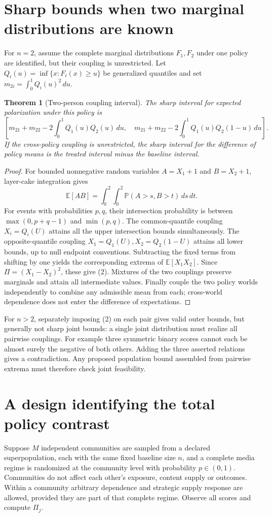 \documentclass[11pt,a4paper]{article}
\newtheorem{theorem}{Theorem}[section]
\newcommand{\E}{\mathbb E}
\newcommand{\Prob}{\mathbb P}
\begin{document}
\section{Sharp bounds when two marginal distributions are known}
For $n=2$, assume the complete marginal distributions $F_1,F_2$ under one policy are identified, but their coupling is unrestricted. Let $Q_i(u)=\inf\{x:F_i(x)\ge u\}$ be generalized quantiles and set $m_{2i}=\int_0^1Q_i(u)^2\,du$.

\begin{theorem}[Two-person coupling interval]
The sharp interval for expected polarization under this policy is
\[
 \left[
 m_{21}+m_{22}-2\int_0^1Q_1(u)Q_2(u)\,du,
 \quad
 m_{21}+m_{22}-2\int_0^1Q_1(u)Q_2(1-u)\,du
 \right].                                                \tag{2}
\]
If the cross-policy coupling is unrestricted, the sharp interval for the difference of policy means is the treated interval minus the baseline interval.
\end{theorem}
\begin{proof}
For bounded nonnegative random variables $A=X_1+1$ and $B=X_2+1$, layer-cake integration gives
\[
 \E[AB]=\int_0^2\int_0^2\Prob(A>s,B>t)\,ds\,dt.
\]
For events with probabilities $p,q$, their intersection probability is between $\max(0,p+q-1)$ and $\min(p,q)$. The common-quantile coupling $X_i=Q_i(U)$ attains all the upper intersection bounds simultaneously. The opposite-quantile coupling $X_1=Q_1(U),X_2=Q_2(1-U)$ attains all lower bounds, up to null endpoint conventions. Subtracting the fixed terms from shifting by one yields the corresponding extrema of $\E[X_1X_2]$. Since $\Pi=(X_1-X_2)^2$, these give (2). Mixtures of the two couplings preserve marginals and attain all intermediate values. Finally couple the two policy worlds independently to combine any admissible mean from each; cross-world dependence does not enter the difference of expectations.
\end{proof}

For $n>2$, separately imposing (2) on each pair gives valid outer bounds, but generally not sharp joint bounds: a single joint distribution must realize all pairwise couplings. For example three symmetric binary scores cannot each be almost surely the negative of both others. Adding the three asserted relations gives a contradiction. Any proposed population bound assembled from pairwise extrema must therefore check joint feasibility.

\section{A design identifying the total policy contrast}
Suppose $M$ independent communities are sampled from a declared superpopulation, each with the same fixed baseline size $n$, and a complete media regime is randomized at the community level with probability $p\in(0,1)$. Communities do not affect each other's exposure, content supply or outcomes. Within a community arbitrary dependence and strategic supply response are allowed, provided they are part of that complete regime. Observe all scores and compute $\Pi_j$.
\end{document}
